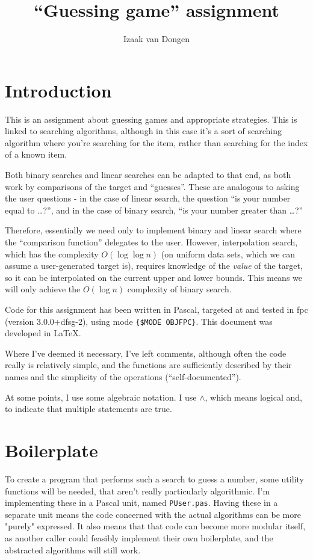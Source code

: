 \documentclass{article}
\title{``Guessing game'' assignment}
\author{Izaak van Dongen}
\begin{document}
    \maketitle
    \tableofcontents
    \lstlistoflistings

    \section{Introduction}
    This is an assignment about guessing games and appropriate strategies. This
    is linked to searching algorithms, although in this case it's a sort of
    searching algorithm where you're searching for the item, rather than
    searching for the index of a known item.

    Both binary searches and linear
    searches can be adapted to that end, as both work by comparisons of the
    target and ``guesses''. These are analogous to asking the user questions - in
    the case of linear search, the question ``is your number equal to \ldots?'',
    and in the case of binary search, ``is your number greater than \ldots?''

    Therefore, essentially we need only to implement binary and linear search
    where the ``comparison function'' delegates to the user.  However,
    interpolation search, which has the complexity $O(\log\log n)$ (on uniform
    data sets, which we can assume a user-generated target is), requires
    knowledge of the \textit{value} of the target, so it can be interpolated on
    the current upper and lower bounds. This means we will only achieve the
    $O(\log n)$ complexity of binary search.

    Code for this assignment has been written in Pascal, targeted at and tested
    in fpc (version 3.0.0+dfsg-2), using mode \verb|{$MODE OBJFPC}|. This
    document was developed in \LaTeX.

    Where I've deemed it necessary, I've left comments, although often the code
    really is relatively simple, and the functions are sufficiently described
    by their names and the simplicity of the operations (``self-documented'').

    At some points, I use some algebraic notation. I use $\wedge$, which means
    logical and, to indicate that multiple statements are true.

    \section{Boilerplate}
    To create a program that performs such a search to guess a number, some
    utility functions will be needed, that aren't really particularly
    algorithmic. I'm implementing these in a Pascal unit, named
    \verb|PUser.pas|. Having these in a separate unit means the code concerned
    with the actual algorithms can be more "purely" expressed. It also means
    that that code can become more modular itself, as another caller could
    feasibly implement their own boilerplate, and the abstracted algorithms
    will still work.
\end{document}
